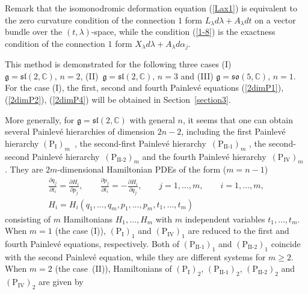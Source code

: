 \documentclass[pdftex]{sigma}
\numberwithin{equation}{section}
\begin{document}
Remark that the isomonodromic deformation equation (\ref{Lax1}) is equivalent to the zero curvature condition of the connection $1$ form $L_\lambda d\lambda + A_\lambda dt$ on a vector bundle over the $(t,\lambda )$-space, while the condition (\ref{1-8}) is the exactness condition of the connection $1$ form $X_\lambda d\lambda + A_\lambda d\alpha _j$.

This method is demonstrated for the following three cases (I) $\mathfrak{g} = \mathfrak{sl}(2, \mathbb{C}),\,n = 2$,
(II)~$\mathfrak{g} = \mathfrak{sl}(2, \mathbb{C}),\,n = 3$ and (III) $\mathfrak{g} = \mathfrak{so}(5, \mathbb{C}),\,n =1$.
For the case (I), the f\/irst, second and fourth Painlev\'{e} equations (\ref{2dimP1}), (\ref{2dimP2}), (\ref{2dimP4})
will be obtained in Section~\ref{section3}.

More generally, for $\mathfrak{g} = \mathfrak{sl}(2, \mathbb{C})$ with general $n$, it seems that one can obtain several Painlev\'{e} hierarchies of dimension $2n-2$, including the f\/irst Painlev\'{e} hierarchy $(\text{P}_\text{I})_m$~\cite{Koi, Kud, Shi}, the second-f\/irst Painlev\'{e} hierarchy~$(\text{P}_\text{II-1})_m$ \cite{CJM, CJP, Koi, Kud}, the second-second Painlev\'{e} hierarchy~$(\text{P}_\text{II-2})_m$ and the fourth Painlev\'{e} hierarchy~$(\text{P}_\text{IV})_m$ \cite{GJP, Koi}. They are $2m$-dimensional Hamiltonian PDEs of the form ($m=n-1$)
\begin{gather*}
\frac{\partial q_j}{\partial t_i} = \frac{\partial H_i}{\partial p_j},\qquad
\frac{\partial p_j}{\partial t_i} = -\frac{\partial H_i}{\partial q_j},\qquad j=1,\dots ,m, \qquad i=1,\dots ,m, \\
H_i = H_i(q_1, \dots ,q_m, p_1, \dots ,p_m, t_1, \dots ,t_m)
\end{gather*}
consisting of $m$ Hamiltonians $H_1, \dots ,H_m$ with $m$ independent variables $t_1, \dots ,t_m$. When $m=1$ (the case (I)), $(\text{P}_\text{I})_1$ and $(\text{P}_\text{IV})_1$ are reduced to the f\/irst and fourth Painlev\'{e} equations, respectively. Both of $(\text{P}_\text{II-1})_1$ and $(\text{P}_\text{II-2})_1$ coincide with the second Painlev\'{e} equation, while they are dif\/ferent systems for $m\geq 2$. When $m=2$ (the case~(II)), Hamiltonians of $(\text{P}_\text{I})_2$, $(\text{P}_\text{II-1})_2$, $(\text{P}_\text{II-2})_2$ and $(\text{P}_\text{IV})_2$ are given by
\end{document}
